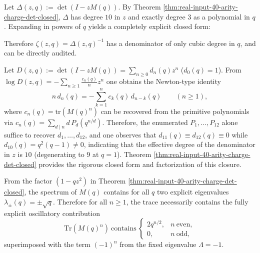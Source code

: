 \begin{remark}\label{rem:real-input-40-arity-charge-det-q-cubic}
Let $\Delta(z,q):=\det(I-zM(q))$. By Theorem \ref{thm:real-input-40-arity-charge-det-closed}, $\Delta$ has degree $10$ in $z$ and exactly degree $3$ as a polynomial in $q$.
Expanding in powers of $q$ yields a completely explicit closed form:

Therefore $\zeta(z,q)=\Delta(z,q)^{-1}$ has a denominator of only cubic degree in $q$, and can be directly audited.
\end{remark}

\begin{remark}\label{rem:real-input-40-arity-charge-newton}
Let
\(
D(z,q):=\det(I-zM(q))=\sum_{n\ge 0}d_n(q)z^n
\) ($d_0(q)=1$).
From
\(
\log D(z,q)=-\sum_{n\ge 1}\frac{c_n(q)}{n}z^n
\)
one obtains the Newton-type identity
\[
n\,d_n(q)=-\sum_{k=1}^n c_k(q)\,d_{n-k}(q)\qquad(n\ge 1),
\]
where $c_n(q)=\mathrm{tr}(M(q)^n)$ can be recovered from the primitive polynomials via
\(
c_n(q)=\sum_{d\mid n} d\,P_d\!\left(q^{n/d}\right)
\).
Therefore, the enumerated $P_1,\dots,P_{12}$ alone suffice to recover $d_1,\dots,d_{12}$,
and one observes that $d_{11}(q)\equiv d_{12}(q)\equiv 0$ while $d_{10}(q)=q^2(q-1)\neq 0$,
indicating that the effective degree of the denominator in $z$ is $10$ (degenerating to $9$ at $q=1$).
Theorem \ref{thm:real-input-40-arity-charge-det-closed} provides the rigorous closed form and factorization of this closure.
\end{remark}

\begin{corollary}\label{cor:real-input-40-arity-charge-sqrtq}
From the factor $(1-qz^2)$ in Theorem \ref{thm:real-input-40-arity-charge-det-closed}, the spectrum of $M(q)$ contains for all $q$ two explicit eigenvalues
\(
\lambda_\pm(q)=\pm\sqrt q
\).
Therefore for all $n\ge 1$, the trace necessarily contains the fully explicit oscillatory contribution
\[
\mathrm{Tr}(M(q)^n)\ \text{contains}\
\begin{cases}
2q^{n/2},&n\ \text{even},\\
0,&n\ \text{odd},
\end{cases}
\]
superimposed with the term $(-1)^n$ from the fixed eigenvalue $\Lambda=-1$.
\end{corollary}

